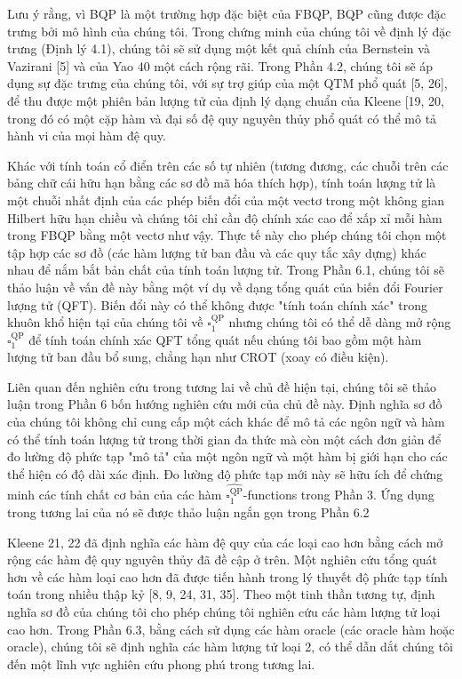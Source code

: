 \documentclass[10pt]{article}
\begin{document}
Lưu ý rằng, vì BQP là một trường hợp đặc biệt của FBQP, BQP cũng được đặc trưng bởi mô hình của chúng tôi. Trong chứng minh của chúng tôi về định lý đặc trưng (Định lý 4.1), chúng tôi sẽ sử dụng một kết quả chính của Bernstein và Vazirani [5] và của Yao 40 một cách rộng rãi. Trong Phần 4.2, chúng tôi sẽ áp dụng sự đặc trưng của chúng tôi, với sự trợ giúp của một QTM phổ quát [5, 26], để thu được một phiên bản lượng tử của định lý dạng chuẩn của Kleene [19, 20, trong đó có một cặp hàm và đại số đệ quy nguyên thủy phổ quát có thể mô tả hành vi của mọi hàm đệ quy.

Khác với tính toán cổ điển trên các số tự nhiên (tương đương, các chuỗi trên các bảng chữ cái hữu hạn bằng các sơ đồ mã hóa thích hợp), tính toán lượng tử là một chuỗi nhất định của các phép biến đổi của một vectơ trong một không gian Hilbert hữu hạn chiều và chúng tôi chỉ cần độ chính xác cao để xấp xỉ mỗi hàm trong FBQP bằng một vectơ như vậy. Thực tế này cho phép chúng tôi chọn một tập hợp các sơ đồ (các hàm lượng tử ban đầu và các quy tắc xây dựng) khác nhau để nắm bắt bản chất của tính toán lượng tử. Trong Phần 6.1, chúng tôi sẽ thảo luận về vấn đề này bằng một ví dụ về dạng tổng quát của biến đổi Fourier lượng tử (QFT). Biến đổi này có thể không được "tính toán chính xác" trong khuôn khổ hiện tại của chúng tôi về $\square_{1}^{\mathrm{QP}}$ nhưng chúng tôi có thể dễ dàng mở rộng $\square_{1}^{\mathrm{QP}}$ để tính toán chính xác QFT tổng quát nếu chúng tôi bao gồm một hàm lượng tử ban đầu bổ sung, chẳng hạn như CROT (xoay có điều kiện).

Liên quan đến nghiên cứu trong tương lai về chủ đề hiện tại, chúng tôi sẽ thảo luận trong Phần 6 bốn hướng nghiên cứu mới của chủ đề này. Định nghĩa sơ đồ của chúng tôi không chỉ cung cấp một cách khác để mô tả các ngôn ngữ và hàm có thể tính toán lượng tử trong thời gian đa thức mà còn một cách đơn giản để đo lường độ phức tạp "mô tả" của một ngôn ngữ và một hàm bị giới hạn cho các thể hiện có độ dài xác định. Đo lường độ phức tạp mới này sẽ hữu ích để chứng minh các tính chất cơ bản của các hàm $\widehat{\square_{1}^{\mathrm{QP}}}$-functions trong Phần 3. Ứng dụng trong tương lai của nó sẽ được thảo luận ngắn gọn trong Phần 6.2

Kleene 21, 22 đã định nghĩa các hàm đệ quy của các loại cao hơn bằng cách mở rộng các hàm đệ quy nguyên thủy đã đề cập ở trên. Một nghiên cứu tổng quát hơn về các hàm loại cao hơn đã được tiến hành trong lý thuyết độ phức tạp tính toán trong nhiều thập kỷ [8, 9, 24, 31, 35]. Theo một tinh thần tương tự, định nghĩa sơ đồ của chúng tôi cho phép chúng tôi nghiên cứu các hàm lượng tử loại cao hơn. Trong Phần 6.3, bằng cách sử dụng các hàm oracle (các oracle hàm hoặc oracle), chúng tôi sẽ định nghĩa các hàm lượng tử loại 2, có thể dẫn dắt chúng tôi đến một lĩnh vực nghiên cứu phong phú trong tương lai.
\end{document}
